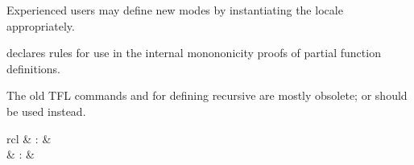 \begin{isabellebody}
\begin{isamarkuptext}
\begin{description}
  Experienced users may define new modes by instantiating the locale
   appropriately.

  \item \hyperlink{attribute.HOL.partial-function-mono}{\mbox{}} declares rules for
  use in the internal monononicity proofs of partial function
  definitions.

  \end{description}%
\end{isamarkuptext}%
\isamarkuptrue%
%
\isamarkuptrue%
%
\begin{isamarkuptext}%
The old TFL commands \hyperlink{command.HOL.recdef}{\mbox{}} and \hyperlink{command.HOL.recdef-tc}{\mbox{}} for defining recursive are mostly obsolete; \hyperlink{command.HOL.function}{\mbox{}} or \hyperlink{command.HOL.fun}{\mbox{}} should be used instead.

  \begin{matharray}{rcl}
    \hypertarget{command.HOL.recdef}{\hyperlink{command.HOL.recdef}{\mbox{}}} & : &  \\
    \hypertarget{command.HOL.recdef-tc}{\hyperlink{command.HOL.recdef-tc}{\mbox{}}} & : &  \\
  \end{matharray}


\end{isamarkuptext}
\end{isabellebody}
